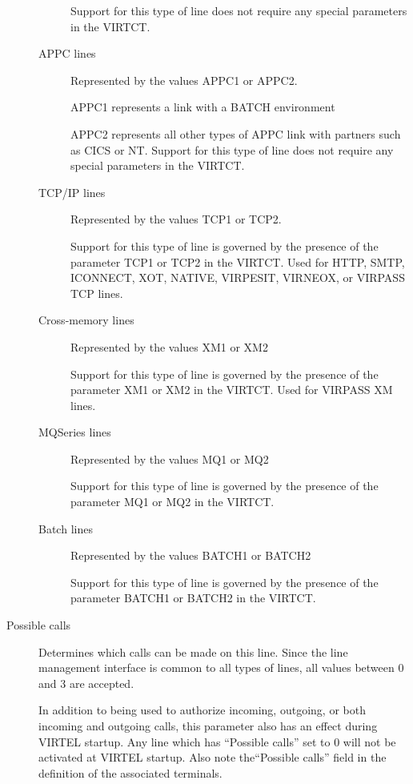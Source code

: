 \documentclass[letterpaper,10pt,english]{sphinxmanual}
\begin{document}
\begin{description}
\begin{description}
Support for this type of line does not require any special
parameters in the VIRTCT.

\item[{APPC lines}] \leavevmode
Represented by the values APPC1 or APPC2.

APPC1 represents a link with a BATCH environment

APPC2 represents all other types of APPC link with partners such as
CICS or NT. Support for this type of line does not require any
special parameters in the VIRTCT.

\item[{TCP/IP lines}] \leavevmode
Represented by the values TCP1 or TCP2.

Support for this type of line is governed by the presence of the
parameter TCP1 or TCP2 in the VIRTCT. Used for HTTP, SMTP, ICONNECT,
XOT, NATIVE, VIRPESIT, VIRNEOX, or VIRPASS TCP lines.

\item[{Cross-memory lines}] \leavevmode
Represented by the values XM1 or XM2

Support for this type of line is governed by the presence of the
parameter XM1 or XM2 in the VIRTCT. Used for VIRPASS XM lines.

\item[{MQSeries lines}] \leavevmode
Represented by the values MQ1 or MQ2

Support for this type of line is governed by the presence of the
parameter MQ1 or MQ2 in the VIRTCT.

\item[{Batch lines}] \leavevmode
Represented by the values BATCH1 or BATCH2

Support for this type of line is governed by the presence of the
parameter BATCH1 or BATCH2 in the VIRTCT.

\end{description}

\item[{Possible calls}] \leavevmode
Determines which calls can be made on this line. Since the line
management interface is common to all types of lines, all values
between 0 and 3 are accepted.

In addition to being used to authorize incoming, outgoing, or both
incoming and outgoing calls, this parameter also has an effect
during VIRTEL startup. Any line which has “Possible calls” set to 0
will not be activated at VIRTEL startup. Also note the“Possible
calls” field in the definition of the associated terminals.


\end{description}
\end{document}
